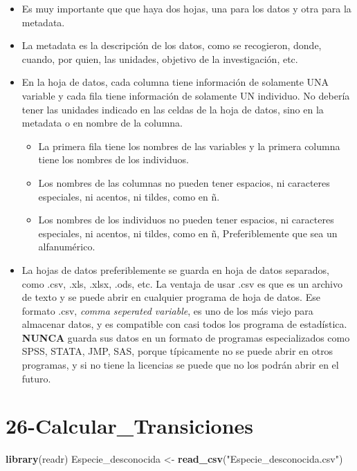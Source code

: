 \documentclass[
]{book}
\newenvironment{Shaded}{\begin{snugshade}}{\end{snugshade}}
\newcommand{\FunctionTok}[1]{\textcolor[rgb]{0.13,0.29,0.53}{\textbf{#1}}}
\newcommand{\NormalTok}[1]{#1}
\newcommand{\OtherTok}[1]{\textcolor[rgb]{0.56,0.35,0.01}{#1}}
\newcommand{\StringTok}[1]{\textcolor[rgb]{0.31,0.60,0.02}{#1}}
\providecommand{\tightlist}{%
  \setlength{\itemsep}{0pt}\setlength{\parskip}{0pt}}
\theoremstyle{definition}
\theoremstyle{definition}
\theoremstyle{definition}
\theoremstyle{definition}
\theoremstyle{remark}
\begin{document}
\begin{itemize}
\tightlist
\item
  Es muy importante que que haya dos hojas, una para los datos y otra para la metadata.
\item
  La metadata es la descripción de los datos, como se recogieron, donde, cuando, por quien, las unidades, objetivo de la investigación, etc.
\item
  En la hoja de datos, cada columna tiene información de solamente UNA variable y cada fila tiene información de solamente UN individuo. No debería tener las unidades indicado en las celdas de la hoja de datos, sino en la metadata o en nombre de la columna.

  \begin{itemize}
  \tightlist
  \item
    La primera fila tiene los nombres de las variables y la primera columna tiene los nombres de los individuos.
  \item
    Los nombres de las columnas no pueden tener espacios, ni caracteres especiales, ni acentos, ni tildes, como en ñ.
  \item
    Los nombres de los individuos no pueden tener espacios, ni caracteres especiales, ni acentos, ni tildes, como en ñ, Preferiblemente que sea un alfanumérico.
  \end{itemize}
\item
  La hojas de datos preferiblemente se guarda en hoja de datos separados, como .csv, .xls, .xlsx, .ods, etc. La ventaja de usar .csv es que es un archivo de texto y se puede abrir en cualquier programa de hoja de datos. Ese formato .csv, \emph{comma seperated variable}, es uno de los más viejo para almacenar datos, y es compatible con casi todos los programa de estadística. \textbf{NUNCA} guarda sus datos en un formato de programas especializados como SPSS, STATA, JMP, SAS, porque típicamente no se puede abrir en otros programas, y si no tiene la licencias se puede que no los podrán abrir en el futuro.
\end{itemize}

\chapter{26-Calcular\_Transiciones}\label{calcular_transiciones}

\begin{Shaded}
\begin{Highlighting}[]
\FunctionTok{library}\NormalTok{(readr)}
\NormalTok{Especie\_desconocida }\OtherTok{\textless{}{-}} \FunctionTok{read\_csv}\NormalTok{(}\StringTok{"Especie\_desconocida.csv"}\NormalTok{)}
\end{Highlighting}
\end{Shaded}
\end{document}
